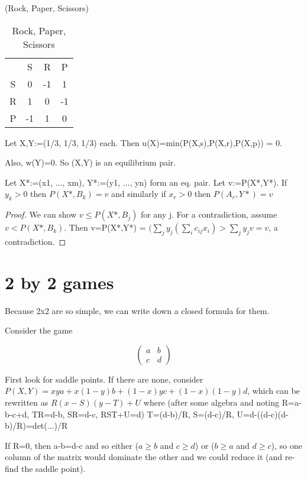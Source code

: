 \begin{example} (Rock, Paper, Scissors)
\begin{table}
\caption{Rock, Paper, Scissors}
\begin{tabular}{c | c | c | c}
\toprule 
 & S & R & P \\
S& 0 & -1 & 1 \\
R&1& 0 &-1 \\
P&-1&1&0 \\
\bottomrule
\end{tabular}
\end{table}

Let X,Y:=(1/3, 1/3, 1/3) each. Then u(X)=min(P(X,s),P(X,r),P(X,p)) = 0.

Also, w(Y)=0. So (X,Y) is an equilibrium pair.
\end{example}

\begin{theorem}
Let X*:=(x1, ..., xm), Y*:=(y1, ..., yn) form an eq. pair. Let v:=P(X*,Y*). If $y_k >0$ then $P(X*,B_k)=v$ and similarly if $x_r > 0$ then $P(A_r,Y*) = v$
\end{theorem}

\begin{proof}
We can show $v \leq P(X*,B_j)$ for any j. For a contradiction, assume $v < P(X*,B_k)$. Then v=P(X*,Y*) = $(\sum_j y_j (\sum_i c_{ij}x_i) > \sum_j y_jv = v$, a contradiction.
\end{proof}


\section{2 by 2 games}
Because 2x2 are so simple, we can write down a closed formula for them. 

Consider the game

\[\left(\begin{matrix}
a & b \\
c & d
\end{matrix}\right)\]

First look for saddle points. If there are none, consider $P(X,Y)=xya + x(1-y)b + (1-x)yc + (1-x)(1-y)d$, which can be rewritten as $R(x-S)(y-T) + U$ where (after some algebra and noting R=a-b-c+d, TR=d-b, SR=d-c, RST+U=d) T=(d-b)/R, S=(d-c)/R, U=d-((d-c)(d-b)/R)=det(...)/R

If R=0, then a-b=d-c and so either ($a \geq b$ and $c \geq d$) or ($b \geq a$ and $d \geq c$), so one column of the matrix would dominate the other and we could reduce it (and re-find the saddle point).

